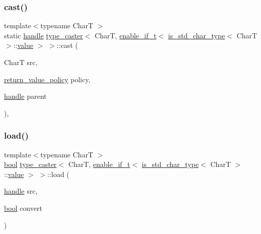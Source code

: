 \subsubsection{\texorpdfstring{cast()}{cast()}\hspace{0.1cm}{\footnotesize\ttfamily [2/2]}}
{\footnotesize\ttfamily template$<$typename CharT $>$ \\
static \mbox{\hyperlink{classhandle}{handle}} \mbox{\hyperlink{classtype__caster}{type\+\_\+caster}}$<$ CharT, \mbox{\hyperlink{detail_2common_8h_a012819c9e8b5e04872a271f50f8b8196}{enable\+\_\+if\+\_\+t}}$<$ \mbox{\hyperlink{cast_8h_a0ee0eaf3d12f9b0e472ed620777ba3c3}{is\+\_\+std\+\_\+char\+\_\+type}}$<$ CharT $>$\+::\mbox{\hyperlink{_s_d_l__opengl__glext_8h_a8ad81492d410ff2ac11f754f4042150f}{value}} $>$ $>$\+::cast (\begin{DoxyParamCaption}\item[{CharT}]{src,  }\item[{\mbox{\hyperlink{detail_2common_8h_adde72ab1fb0dd4b48a5232c349a53841}{return\+\_\+value\+\_\+policy}}}]{policy,  }\item[{\mbox{\hyperlink{classhandle}{handle}}}]{parent }\end{DoxyParamCaption})\hspace{0.3cm}{\ttfamily [inline]}, {\ttfamily [static]}}

\mbox{\label{structtype__caster_3_01_char_t_00_01enable__if__t_3_01is__std__char__type_3_01_char_t_01_4_1_1value_01_4_01_4_a156ae9547f1fc1aaa58bd4a8650d88a3}} 
\subsubsection{\texorpdfstring{load()}{load()}}
{\footnotesize\ttfamily template$<$typename CharT $>$ \\
\mbox{\hyperlink{asdl_8h_af6a258d8f3ee5206d682d799316314b1}{bool}} \mbox{\hyperlink{classtype__caster}{type\+\_\+caster}}$<$ CharT, \mbox{\hyperlink{detail_2common_8h_a012819c9e8b5e04872a271f50f8b8196}{enable\+\_\+if\+\_\+t}}$<$ \mbox{\hyperlink{cast_8h_a0ee0eaf3d12f9b0e472ed620777ba3c3}{is\+\_\+std\+\_\+char\+\_\+type}}$<$ CharT $>$\+::\mbox{\hyperlink{_s_d_l__opengl__glext_8h_a8ad81492d410ff2ac11f754f4042150f}{value}} $>$ $>$\+::load (\begin{DoxyParamCaption}\item[{\mbox{\hyperlink{classhandle}{handle}}}]{src,  }\item[{\mbox{\hyperlink{asdl_8h_af6a258d8f3ee5206d682d799316314b1}{bool}}}]{convert }\end{DoxyParamCaption})\hspace{0.3cm}{\ttfamily [inline]}}

